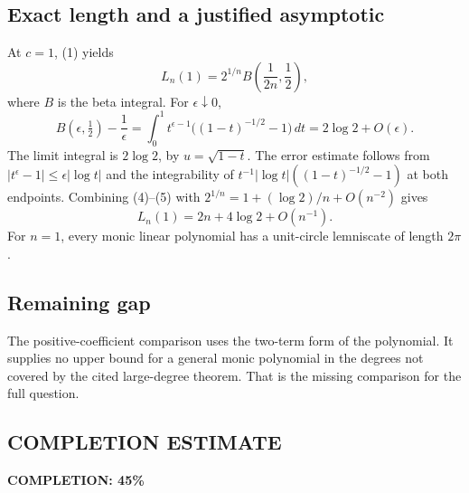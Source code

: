 \subsection*{Exact length and a justified asymptotic}
At $c=1$, (1) yields
\[
 L_n(1)=2^{1/n}B\left(\frac1{2n},\frac12\right), \tag{4}
\]
where $B$ is the beta integral. For $\epsilon\downarrow0$,
\[
 B(\epsilon,\tfrac12)-\frac1\epsilon
 =\int_0^1 t^{\epsilon-1}\big((1-t)^{-1/2}-1\big)\,dt
 =2\log2+O(\epsilon). \tag{5}
\]
The limit integral is $2\log2$, by $u=\sqrt{1-t}$. The error estimate follows from $|t^\epsilon-1|\le\epsilon|\log t|$ and the integrability of
$t^{-1}|\log t|((1-t)^{-1/2}-1)$ at both endpoints. Combining (4)--(5) with
$2^{1/n}=1+(\log2)/n+O(n^{-2})$ gives
\[
 L_n(1)=2n+4\log2+O(n^{-1}).
\]
For $n=1$, every monic linear polynomial has a unit-circle lemniscate of length $2\pi$.

\subsection*{Remaining gap}
The positive-coefficient comparison uses the two-term form of the polynomial. It supplies no upper bound for a general monic polynomial in the degrees not covered by the cited large-degree theorem. That is the missing comparison for the full question.
\subsection*{COMPLETION ESTIMATE}
\textbf{COMPLETION: 45\%}
